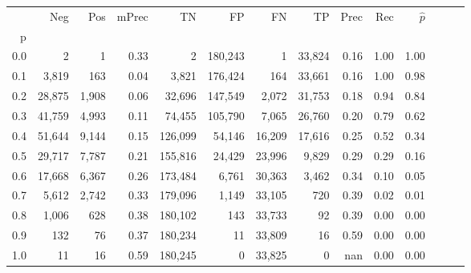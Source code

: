 \begin{tabular}{rrrrrrrrrrrrrr}
\toprule
{} &     Neg &    Pos & mPrec &       TN &       FP &      FN &      TP &  Prec &   Rec & $\hat{p}$ \\
p   &         &        &       &          &          &         &         &       &       &           \\
\midrule
0.0 &       2 &      1 &  0.33 &        2 &  180,243 &       1 &  33,824 &  0.16 &  1.00 &      1.00 \\
0.1 &   3,819 &    163 &  0.04 &    3,821 &  176,424 &     164 &  33,661 &  0.16 &  1.00 &      0.98 \\
0.2 &  28,875 &  1,908 &  0.06 &   32,696 &  147,549 &   2,072 &  31,753 &  0.18 &  0.94 &      0.84 \\
0.3 &  41,759 &  4,993 &  0.11 &   74,455 &  105,790 &   7,065 &  26,760 &  0.20 &  0.79 &      0.62 \\
0.4 &  51,644 &  9,144 &  0.15 &  126,099 &   54,146 &  16,209 &  17,616 &  0.25 &  0.52 &      0.34 \\
0.5 &  29,717 &  7,787 &  0.21 &  155,816 &   24,429 &  23,996 &   9,829 &  0.29 &  0.29 &      0.16 \\
0.6 &  17,668 &  6,367 &  0.26 &  173,484 &    6,761 &  30,363 &   3,462 &  0.34 &  0.10 &      0.05 \\
0.7 &   5,612 &  2,742 &  0.33 &  179,096 &    1,149 &  33,105 &     720 &  0.39 &  0.02 &      0.01 \\
0.8 &   1,006 &    628 &  0.38 &  180,102 &      143 &  33,733 &      92 &  0.39 &  0.00 &      0.00 \\
0.9 &     132 &     76 &  0.37 &  180,234 &       11 &  33,809 &      16 &  0.59 &  0.00 &      0.00 \\
1.0 &      11 &     16 &  0.59 &  180,245 &        0 &  33,825 &       0 &   nan &  0.00 &      0.00 \\
\bottomrule
\end{tabular}
